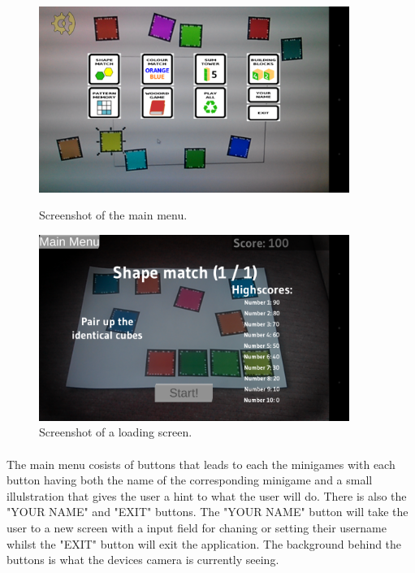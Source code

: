 
\begin{figure}[h]
	\centering
	\begin{minipage}{.5\textwidth}
		\capstart
		\centering
		\includegraphics[width=0.9\textwidth]{images/main_menu.png}
		\vspace{-10pt}
		\caption{Screenshot of the main menu.}
		\label{fig:main_menu}
	\end{minipage}%
	\begin{minipage}{.5\textwidth}
		\capstart
		\centering
		\includegraphics[width=0.9\textwidth]{images/loading_screen.png}
		\vspace{-10pt}
		\caption{Screenshot of a loading screen.}
		\label{fig:loading_screen}
	\end{minipage}%
\end{figure}

\paragraph{}
The main menu cosists of buttons that leads to each the minigames with each button having both the name of the corresponding
minigame and a small illulstration that gives the user a hint to what the user will do.
There is also the "YOUR NAME" and "EXIT" buttons. The "YOUR NAME" button will take the user to a new screen with a input field 
for chaning or setting their username whilst the "EXIT" button will exit the application.
The background behind the buttons is what the devices camera is currently seeing.

